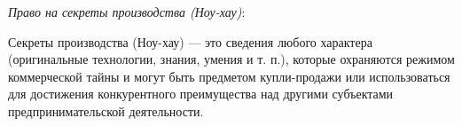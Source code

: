 \textit{Право на секреты производства (Ноу-хау)}:

Секреты производства (Ноу-хау) — это сведения любого характера (оригинальные технологии, знания, умения и т. п.), которые охраняются режимом коммерческой тайны и могут быть предметом купли-продажи или использоваться для достижения конкурентного преимущества над другими субъектами предпринимательской деятельности.
\\
